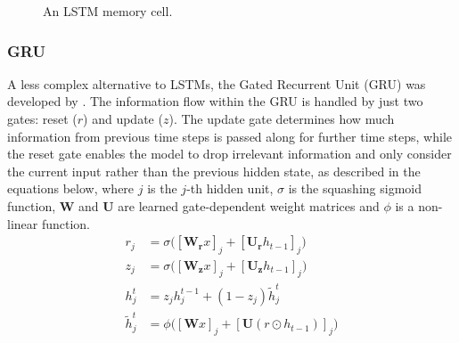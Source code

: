 \begin{figure}[htb]
	\caption[LSTM Memory Cell]{An LSTM memory cell.}
	\label{fig:memoryCellLSTM}
\end{figure}

\subsubsection{GRU}\label{GRU}
A less complex alternative to LSTMs, the Gated Recurrent Unit (GRU) was developed by \cite{Cho2014}. The information flow within the GRU is handled by just two gates: reset ($r$) and update ($z$). The update gate determines how much information from previous time steps is passed along for further time steps, while the reset gate enables the model to drop irrelevant information and only consider the current input rather than the previous hidden state, as described in the equations below, where $j$ is the $j$-th hidden unit, $\sigma$ is the squashing sigmoid function, $\boldsymbol{W}$ and $\boldsymbol{U}$ are learned gate-dependent weight matrices and $\phi$ is a non-linear function.
\begin{align*}
r_j &= \sigma \big( [\boldsymbol{W_{r}}x]_{j} + [\boldsymbol{U_{r}}h_{t-1}]_{j} \big) \\
z_j &= \sigma \big( [\boldsymbol{W_{z}}x]_{j} + [\boldsymbol{U_{z}}h_{t-1}]_{j} \big) \\
h_{j}^{t} &= z_{j}h_{j}^{t-1} + (1 - z_{j}) \tilde{h}_{j}^{t} \\
\tilde{h}_{j}^{t} &= \phi \big( [\boldsymbol{W}x]_{j} +[\boldsymbol{U}(r \odot h_{t-1})]_{j} \big)
\end{align*}

